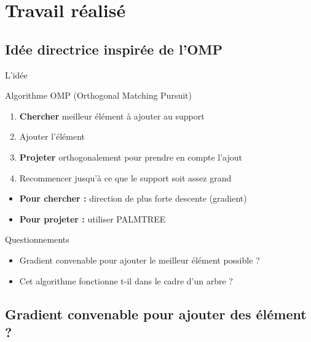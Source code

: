 \section{Travail réalisé}

\subsection{Idée directrice inspirée de l'OMP}
\begin{frame}{L'idée}
\begin{block}{Algorithme OMP (Orthogonal Matching Pursuit)}
	\begin{enumerate}
		\item \textbf{Chercher} meilleur élément à ajouter au support
		\item Ajouter l'élément
		\item \textbf{Projeter} orthogonalement pour prendre en compte l'ajout
		\item Recommencer jusqu'à ce que le support soit assez grand
	\end{enumerate}
\end{block}
\begin{itemize}
\item \textbf{Pour chercher :} direction de plus forte descente (gradient)
\item \textbf{Pour projeter :} utiliser PALMTREE
\end{itemize}
\begin{exampleblock}{Questionnements}
\begin{itemize}
	\item Gradient convenable pour ajouter le meilleur élément possible ?
	\item Cet algorithme fonctionne t-il dans le cadre d'un arbre ?
\end{itemize}
\end{exampleblock}
\end{frame}


\subsection{Gradient convenable pour ajouter des élément ?}

